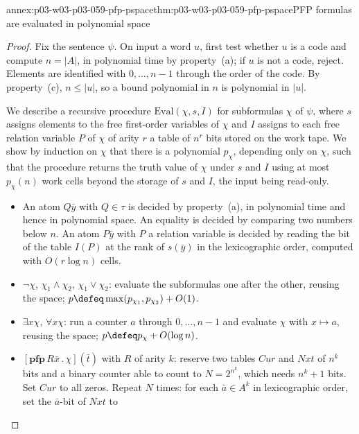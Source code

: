 \begin{annexitem}{annex:p03-w03-p03-059-pfp-pspace}{thm:p03-w03-p03-059-pfp-pspace}{PFP formulas are evaluated in polynomial space}
\begin{proof}
Fix the sentence \(\psi\). On input a word \(u\), first test whether \(u\)
is a code and compute \(n=|A|\), in polynomial time by property~(a); if
\(u\) is not a code, reject. Elements are identified with
\(0,\ldots,n-1\) through the order of the code. By property~(c),
\(n\leq|u|\), so a bound polynomial in \(n\) is polynomial in \(|u|\).

We describe a recursive procedure \(\mathrm{Eval}(\chi,s,I)\) for
subformulas \(\chi\) of \(\psi\), where \(s\) assigns elements to the free
first-order variables of \(\chi\) and \(I\) assigns to each free relation
variable \(P\) of \(\chi\) of arity \(r\) a table of \(n^r\) bits stored on
the work tape. We show by induction on \(\chi\) that there is a polynomial
\(p_\chi\), depending only on \(\chi\), such that the procedure returns
the truth value of \(\chi\) under \(s\) and \(I\) using at most
\(p_\chi(n)\) work cells beyond the storage of \(s\) and \(I\), the input
being read-only.
\begin{itemize}
 \item An atom \(Q\bar y\) with \(Q\in\tau\) is decided by property~(a),
       in polynomial time and hence in polynomial space. An equality is
       decided by comparing two numbers below \(n\). An atom \(P\bar y\)
       with \(P\) a relation variable is decided by reading the bit of the
       table \(I(P)\) at the rank of \(s(\bar y)\) in the lexicographic
       order, computed with \(O(r\log n)\) cells.
 \item \(\neg\chi\), \(\chi_1\land\chi_2\), \(\chi_1\lor\chi_2\): evaluate
       the subformulas one after the other, reusing the space;
       \(p\defeq\max(p_{\chi_1},p_{\chi_2})+O(1)\).
 \item \(\exists x\chi\), \(\forall x\chi\): run a counter \(a\) through
       \(0,\ldots,n-1\) and evaluate \(\chi\) with \(x\mapsto a\), reusing
       the space; \(p\defeq p_\chi+O(\log n)\).
 \item \([\mathbf{pfp}\,R\bar x\,.\,\chi](\bar t)\) with \(R\) of arity
       \(k\): reserve two tables \(\mathit{Cur}\) and \(\mathit{Nxt}\) of
       \(n^k\) bits and a binary counter able to count to
       \(N=2^{n^k}\), which needs \(n^k+1\) bits. Set \(\mathit{Cur}\)
       to all zeros. Repeat \(N\) times: for each \(\bar a\in A^k\) in
       lexicographic order, set the \(\bar a\)-bit of \(\mathit{Nxt}\) to

\end{itemize}
\end{proof}
\end{annexitem}
